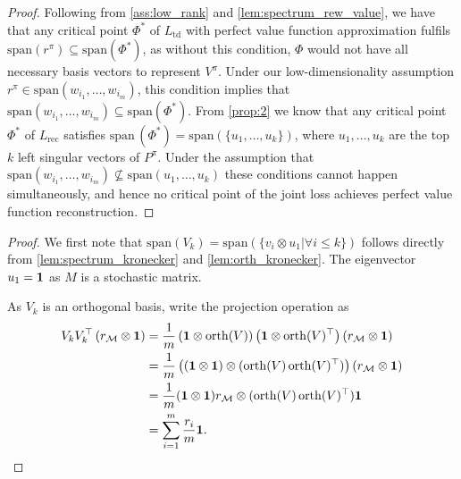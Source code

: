 \ReconsCombined*
\begin{proof}
    Following from \autoref{ass:low_rank} and \cref{lem:spectrum_rew_value}, we have that any critical point $\Phi^*$ of $L_\text{td}$ with perfect value function approximation fulfils $\mathrm{span}(r^\pi)\subseteq \mathrm{span}(\Phi^*)$, as without this condition, $\Phi$ would not have all necessary basis vectors to represent $V^\pi$. Under our low-dimensionality assumption $r^\pi \in \mathrm{span}(w_{i_1},\dots,w_{i_m})$, this condition implies that $\mathrm{span}(w_{i_1},\dots,w_{i_m})\subseteq \mathrm{span}(\Phi^*)$. From \cref{prop:2} we know that any critical point $\Phi^*$ of $L_\text{rec}$ satisfies $\mathrm{span}\,({\Phi^*})=\mathrm{span}\left(\{u_1,\dots,u_k\}\right)$, where $u_1,\dots,u_k$ are the top $k$ left singular vectors of $P^\pi$. Under the assumption that $\mathrm{span}(w_{i_1},\dots,w_{i_m}) \not\subseteq \mathrm{span}(u_1,\dots,u_k)$ these conditions cannot happen simultaneously, and hence no critical point of the joint loss achieves perfect value function reconstruction.
\end{proof}

\topkDistracted*
\begin{proof}
We first note that $\mathrm{span}(V_k) = \mathrm{span}(\{v_i\otimes u_1|\forall i \leq k\})$ follows directly from \autoref{lem:spectrum_kronecker} and \autoref{lem:orth_kronecker}. The eigenvector $u_1 = {\bm{1}}$ as $M$ is a stochastic matrix.

As $V_k$ is an orthogonal basis, write the projection operation as 
\begin{align*}
V_k V_k^\top \left(r_{\mathcal{M}} \otimes {\bm{1}}\right) &= \frac{1}{m}\left({\bm{1}} \otimes \mathrm{orth}(V)\right)\left({\bm{1}} \otimes \mathrm{orth}(V)^\top \right)\left(r_{\mathcal{M}} \otimes {\bm{1}}\right) \\
&= \frac{1}{m}\left(({\bm{1}} \otimes {\bm{1}}) \otimes (\mathrm{orth}(V)\,\mathrm{orth}(V)^\top)\right) (r_{\mathcal{M}} \otimes {\bm{1}})\\
&= \frac{1}{m}({\bm{1}} \otimes {\bm{1}}) r_{\mathcal{M}} \otimes (\mathrm{orth}(V)\,\mathrm{orth}(V)^\top) {\bm{1}} \\
&= \sum_{i=1}^m \frac{r_i}{m}{\bm{1}}.
\end{align*}

\end{proof}
